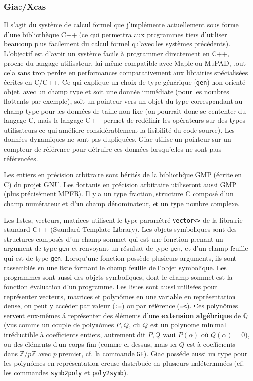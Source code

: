 \documentclass[a4paper,11pt]{article}
\begin{document}
\begin{giacjshere}
\subsubsection{Giac/Xcas}
Il s'agit du système de calcul formel que j'implémente actuellement sous 
forme d'une biblioth\`eque C++ (ce qui
permettra aux programmes tiers d'utiliser beaucoup plus facilement du 
calcul formel qu'avec les syst\`emes pr\'ec\'edents). L'objectif est 
d'avoir un syst\`eme facile \`a programmer directement en C++, proche 
du langage utilisateur, lui-m\^eme compatible avec Maple ou MuPAD, 
tout cela sans trop perdre en performances comparativement aux
librairies sp\'ecialis\'ees \'ecrites en C/C++. Ce qui explique un choix 
de type g\'en\'erique (\verb=gen=) non orient\'e objet, avec un champ type 
et soit une donn\'ee imm\'ediate (pour les nombres flottants par exemple), 
soit un pointeur vers un objet du type correspondant au champ type pour 
les donn\'ees de taille non fixe (on pourrait donc se
contenter du langage C, mais le langage C++ permet de red\'efinir 
les op\'erateurs sur des types utilisateurs ce qui
am\'eliore consid\'erablement la lisibilit\'e du code source). 
Les donn\'ees dynamiques ne sont pas dupliqu\'ees, Giac
utilise un pointeur sur un compteur de r\'ef\'erence pour d\'etruire 
ces donn\'ees lorsqu'elles ne sont plus r\'ef\'erenc\'ees.

Les entiers en pr\'ecision arbitraire sont h\'erit\'es de la biblioth\`que
GMP (\'ecrite en C) du projet GNU. Les flottants en pr\'ecision arbitraire
utiliseront aussi GMP (plus précisément MPFR).
Il y a un type fraction, structure C compos\'e d'un champ num\'erateur
et d'un champ d\'enominateur, et un type nombre complexe.

Les listes, vecteurs, matrices utilisent le type paramétré \verb|vector<>|
de la librairie standard C++ (Standard Template Library).
Les objets symboliques sont des structures compos\'es d'un champ sommet
qui est une fonction prenant un argument de type \verb|gen|
et renvoyant un r\'esultat
de type \verb|gen|, et d'un champ feuille qui est de type \verb|gen|.
Lorsqu'une fonction poss\`ede plusieurs arguments, ils sont rassembl\'es
en une liste formant le champ feuille de l'objet symbolique.
Les programmes sont aussi des objets symboliques, dont le champ
sommet est la fonction évaluation d'un programme.
Les listes sont aussi utilis\'ees pour repr\'esenter vecteurs, matrices
et polyn\^omes en une variable en repr\'esentation dense, on peut
y acc\'eder par valeur (\verb|:=|) ou par r\'ef\'erence
(\verb|=<|). Ces polyn\^omes servent eux-m\^emes \'a repr\'esenter
des \'el\'ements d'une 
{\bf extension alg\'ebrique}  de $\mathbb{Q}$ (vus comme
un couple de polyn\^omes $P,Q$, o\`u $Q$ est un polynome minimal
irr\'eductible \`a coefficients entiers, autrement dit $P,Q$ vaut $P(\alpha)$ 
o\`u $Q(\alpha)=0$),
ou des \'el\'ements d'un corps fini (comme ci-dessus, mais ici $Q$ est
\`a coefficients dans $\mathbb{Z}/p\mathbb{Z}$ avec $p$ premier, cf. la commande \verb|GF|).
Giac poss\'ede aussi un type pour les polyn\^omes
en repr\'esentation creuse distribu\'ee en plusieurs
ind\'etermin\'ees (cf. les commandes \verb|symb2poly| et \verb|poly2symb|).


\end{giacjshere}
\end{document}

